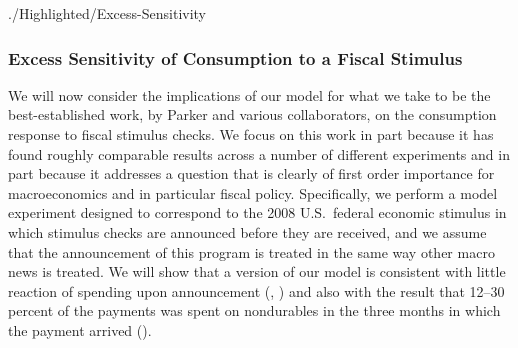 \documentclass[titlepage]{\econtex}
\begin{document}
\begin{verbatimwrite}{./Highlighted/Excess-Sensitivity}
\hypertarget{Excess-Sensitivity-Experiment}{}
\subsubsection{Excess Sensitivity of Consumption to a Fiscal Stimulus}

We will now consider the implications of our model for what we take to be the best-established work, by Parker and various collaborators, on the consumption response to fiscal stimulus checks. We focus on this work in part because it has found roughly comparable results across a number of different experiments and in part because it addresses a question that is clearly of first order importance for macroeconomics and in particular fiscal policy. Specifically, we perform a model experiment designed to correspond to the 2008 U.S.\ federal economic stimulus in which stimulus checks are announced before they are received, and we assume that the announcement of this program is treated in the same way other macro news is treated. We will show that a version of our model is consistent with little reaction of spending upon announcement (\cite{brodaParker}, \cite{parker25million}) and also with the result that 12--30 percent of the payments was spent on nondurables in the three months in which the payment arrived (\cite{psjmMPC2008}).



\end{verbatimwrite}
\end{document}
